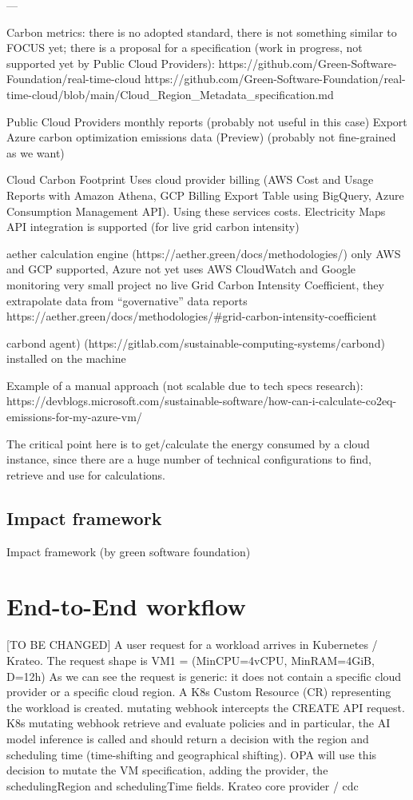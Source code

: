 ---


Carbon metrics:
there is no adopted standard, there is not something similar to FOCUS yet;
there is a proposal for a specification (work in progress, not supported yet by Public Cloud Providers): 
https://github.com/Green-Software-Foundation/real-time-cloud 
https://github.com/Green-Software-Foundation/real-time-cloud/blob/main/Cloud_Region_Metadata_specification.md 


Public Cloud Providers monthly reports (probably not useful in this case)
Export Azure carbon optimization emissions data (Preview) (probably not fine-grained as we want)

Cloud Carbon Footprint
Uses cloud provider billing (AWS Cost and Usage Reports with Amazon Athena, GCP Billing Export Table using BigQuery, Azure Consumption 
Management API). Using these services costs.
Electricity Maps API integration is supported (for live grid carbon intensity)

 
aether calculation engine (https://aether.green/docs/methodologies/) 
only AWS and GCP supported, Azure not yet
uses AWS CloudWatch and Google monitoring
very small project
no live Grid Carbon Intensity Coefficient, they extrapolate data from “governative” data reports
https://aether.green/docs/methodologies/#grid-carbon-intensity-coefficient


carbond agent) (https://gitlab.com/sustainable-computing-systems/carbond)
installed on the machine


Example of a manual approach (not scalable due to tech specs research): https://devblogs.microsoft.com/sustainable-software/how-can-i-calculate-co2eq-emissions-for-my-azure-vm/ 

The critical point here is to get/calculate the energy consumed by a cloud instance, since there are a huge number of technical configurations to find, retrieve and use for calculations.



\subsection{Impact framework}

Impact framework (by green software foundation)

\section{End-to-End workflow}
\label{sec:e2eflow}

[TO BE CHANGED]
A user request for a workload arrives in Kubernetes / Krateo. 
The request shape is VM1 = (MinCPU=4vCPU, MinRAM=4GiB, D=12h)
As we can see the request is generic: it does not contain a specific cloud provider or a specific cloud region.
A K8s Custom Resource (CR) representing the workload is created.
mutating webhook intercepts the CREATE API request.
K8s mutating webhook retrieve and evaluate policies and in particular, the AI model inference is called and should return a decision with the region and scheduling time (time-shifting and geographical shifting).
OPA will use this decision to mutate the VM specification, adding the provider, the schedulingRegion and schedulingTime fields.
Krateo core provider / cdc



